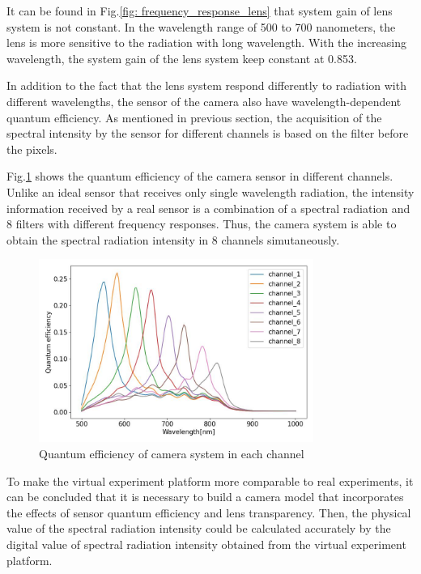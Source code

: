 It can be found in Fig.\ref{fig: frequency_response_lens} that system gain 
of lens system is not constant. In the wavelength range of 500 to 700 nanometers, 
the lens is more sensitive to the radiation with long wavelength. With the 
increasing wavelength, the system gain of the lens system keep constant at 0.853.


In addition to the fact that the lens system respond differently to radiation
with different wavelengths, the sensor of the camera also have wavelength-dependent quantum 
efficiency. As mentioned in previous section, the acquisition of the spectral 
intensity by the sensor for different channels is based on the filter 
before the pixels. 


Fig.\ref{fig: quantum_efficiency} shows the quantum efficiency 
of the camera sensor in different channels. Unlike an ideal sensor that 
receives only single wavelength radiation, the intensity information received 
by a real sensor is a combination of a spectral radiation and 8 filters with 
different frequency responses. Thus, the camera system is able to obtain the 
spectral radiation intensity in 8 channels simutaneously. 


\begin{figure}[htbp]
    \centering
    \includegraphics[width = 0.8\textwidth]{figures/quantum_efficiency.jpg}
    \caption{Quantum efficiency of camera system in each channel}
    \label{fig: quantum_efficiency}
\end{figure}


To make the virtual experiment platform more comparable to real experiments, 
it can be concluded that it is necessary to build a camera model that 
incorporates the effects of sensor quantum efficiency and lens transparency.
Then, the physical value of the spectral radiation intensity could be 
calculated accurately by the digital value of spectral radiation intensity obtained from the virtual experiment 
platform.


